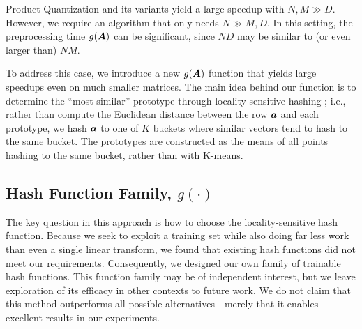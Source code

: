 

Product Quantization and its variants yield a large speedup with $N, M \gg D$. However, we require an algorithm that only needs $N \gg M, D$. In this setting, the preprocessing time $g(\bm{A})$ can be significant, since $ND$ may be similar to (or even larger than) $NM$.

To address this case, we introduce a new $g(\bm{A})$ function that yields large speedups even on much smaller matrices. %
The main idea behind our function is to determine the ``most similar'' prototype through locality-sensitive hashing \cite{lshOrig}; i.e., rather than compute the Euclidean distance between the row $\bm{a}$ and each prototype, we hash $\bm{a}$ to one of $K$ buckets where similar vectors tend to hash to the same bucket. The prototypes are constructed as the means of all points hashing to the same bucket, rather than with K-means.


\subsection{Hash Function Family, $g(\cdot)$}

The key question in this approach is how to choose the locality-sensitive hash function.
Because we seek to exploit a training set while also doing far less work than even a single linear transform, we found that existing hash functions did not meet our requirements. Consequently, we designed our own family of trainable hash functions. This function family may be of independent interest, but we leave exploration of its efficacy in other contexts to future work. We do not claim that this method outperforms all possible alternatives---merely that it enables excellent results in our experiments.


